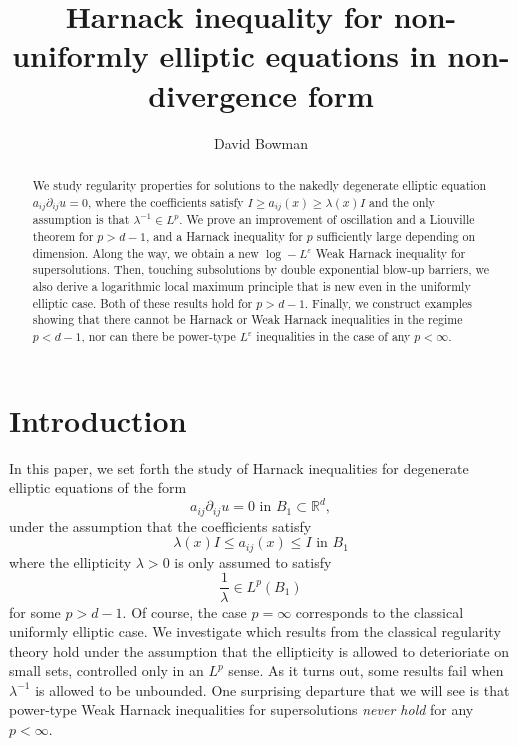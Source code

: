 \documentclass[reqno]{amsart}
\numberwithin{equation}{section}
\numberwithin{equation}{section}
\newcommand{\R}{\mathbb R}
\newcommand{\eps}{\varepsilon}
\newcounter{case}
\begin{document}
\begin{abstract}
We study regularity properties for solutions to the nakedly degenerate elliptic equation $a_{ij}\partial_{ij}u =0$, where the coefficients satisfy $I \ge a_{ij}(x) \ge \lambda(x) I$ and the only assumption is that $\lambda^{-1} \in L^p$. We prove an improvement of oscillation and a Liouville theorem for $p>d-1$, and a Harnack inequality for $p$ sufficiently large depending on dimension. Along the way, we obtain a new $\log-L^\eps$ Weak Harnack inequality for supersolutions. Then, touching subsolutions by double exponential blow-up barriers, we also derive a logarithmic local maximum principle that is new even in the uniformly elliptic case. Both of these results hold for $p>d-1$. Finally, we construct examples showing that there cannot be Harnack or Weak Harnack inequalities in the regime $p<d-1$, nor can there be power-type $L^\eps$ inequalities in the case of any $p<\infty$. 
\end{abstract}

\title{Harnack inequality for non-uniformly elliptic equations in non-divergence form}
\author{David Bowman}
\address[David Bowman]{Department of Mathematics, University of Chicago,  Chicago, Illinois 60637, USA}
\maketitle
\section{Introduction}
\label{sec: intro}
In this paper, we set forth the study of Harnack inequalities for  degenerate elliptic equations of the form 
\begin{equation}
    \label{eq: degen}
    a_{ij}\partial_{ij} u =0 \text{ in } B_1 \subset \R^d,
\end{equation}
under the assumption that the coefficients satisfy
\begin{equation} 
\label{eq: ellipticityassumption}
\lambda(x) I \le a_{ij}(x)  \le I \text{ in } B_1
\end{equation}
where the ellipticity $\lambda>0$ is only assumed to satisfy
\begin{equation}
    \frac1\lambda \in L^p(B_1)
\end{equation}
for some $p>d-1$. Of course, the case $p=\infty$ corresponds to the classical uniformly elliptic case. We investigate which results from the classical regularity theory hold under the assumption that the ellipticity is allowed to deterioriate on small sets, controlled only in an $L^p$ sense. As it turns out, some results fail when $\lambda^{-1}$ is allowed to be unbounded. One surprising departure that we will see is that power-type Weak Harnack inequalities for supersolutions \textit{never hold} for any $p<\infty$. 
\end{document}
